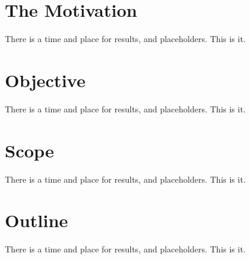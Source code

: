\section{The Motivation}
There is a time and place for results, and placeholders. This is it.\cite{latexcompanion}
\section{Objective}
There is a time and place for results, and placeholders. This is it.\cite{latexcompanion}
\section{Scope}
There is a time and place for results, and placeholders. This is it.\cite{latexcompanion}
\section{Outline}
There is a time and place for results, and placeholders. This is it.\cite{latexcompanion}

